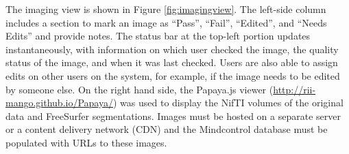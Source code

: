 The imaging view is shown in Figure \ref{fig:imagingview}. The left-side column includes a section to mark an image as ``Pass'', ``Fail'', ``Edited'', and ``Needs Edits'' and provide notes. The status bar at the top-left portion updates instantaneously, with information on which user checked the image, the quality status of the image, and when it was last checked. Users are also able to assign edits on other users on the system, for example, if the image needs to be edited by someone else. On the right hand side, the Papaya.js viewer (\href{http://rii-mango.github.io/Papaya/}{http://rii-mango.github.io/Papaya/}) was used to display the NifTI volumes of the original data and FreeSurfer segmentations. Images must be hosted on a separate server or a content delivery network (CDN) and the Mindcontrol database must be populated with URLs to these images.
